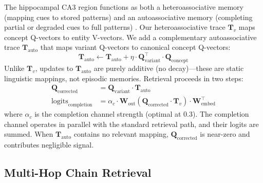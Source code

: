 \documentclass[11pt,a4paper]{article}
\begin{document}
The hippocampal CA3 region functions as both a heteroassociative memory (mapping cues to stored patterns) and an autoassociative memory (completing partial or degraded cues to full patterns) \citep{rolls2013mechanisms}. Our heteroassociative trace $\mathbf{T}_v$ maps concept Q-vectors to entity V-vectors. We add a complementary autoassociative trace $\mathbf{T}_{\text{auto}}$ that maps variant Q-vectors to canonical concept Q-vectors:
\begin{equation}
  \mathbf{T}_{\text{auto}} \leftarrow \mathbf{T}_{\text{auto}} + \eta \cdot \mathbf{Q}_{\text{variant}}^\top \cdot \mathbf{Q}_{\text{concept}}
  \label{eq:tauto_write}
\end{equation}
Unlike $\mathbf{T}_v$, updates to $\mathbf{T}_{\text{auto}}$ are purely additive (no decay)---these are static linguistic mappings, not episodic memories. Retrieval proceeds in two steps:
\begin{align}
  \mathbf{Q}_{\text{corrected}} &= \mathbf{Q}_{\text{variant}} \cdot \mathbf{T}_{\text{auto}} \label{eq:tauto_read} \\
  \text{logits}_{\text{completion}} &= \alpha_c \cdot \mathbf{W}_{\text{out}}(\mathbf{Q}_{\text{corrected}} \cdot \mathbf{T}_v) \cdot \mathbf{W}_{\text{embed}}^\top \label{eq:completion_logits}
\end{align}
where $\alpha_c$ is the completion channel strength (optimal at 0.3). The completion channel operates in parallel with the standard retrieval path, and their logits are summed. When $\mathbf{T}_{\text{auto}}$ contains no relevant mapping, $\mathbf{Q}_{\text{corrected}}$ is near-zero and contributes negligible signal.

\subsection{Multi-Hop Chain Retrieval}
\label{sec:multihop}
\end{document}
